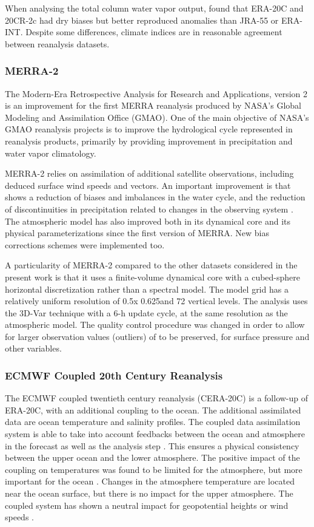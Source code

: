 \documentclass{ametsoc}
\begin{document}
When analysing the total column water vapor output, \citet{Poli2016} found that ERA-20C and 20CR-2c had dry biases but better reproduced anomalies than JRA-55 or ERA-INT. Despite some differences, climate indices are in reasonable agreement between reanalysis datasets.


\subsubsection{MERRA-2}

The Modern-Era Retrospective Analysis for Research and Applications, version 2  \citep[MERRA-2, ][]{Gelaro2017} is an improvement for the first MERRA reanalysis \citep{Rienecker2011} produced by NASA’s Global Modeling and Assimilation Office (GMAO). One of the main objective of NASA's GMAO reanalysis projects is to improve the hydrological cycle represented in reanalysis products, primarily by providing improvement in precipitation and water vapor climatology.

MERRA-2 relies on assimilation of additional satellite observations, including deduced surface wind speeds and vectors. An important improvement is that shows a reduction of biases and imbalances in the water cycle, and the reduction of discontinuities in precipitation related to changes in the observing system \citep{Gelaro2017}. The atmospheric model has also improved both in its dynamical core and its physical parameterizations since the first version of MERRA. New bias corrections schemes were implemented too.

A particularity of MERRA-2 compared to the other datasets considered in the present work is that it uses a finite-volume dynamical core with a cubed-sphere horizontal discretization rather than a spectral model. The model grid has a relatively uniform resolution of 0.5\degree x 0.625\degree and 72 vertical levels. The analysis uses the 3D-Var technique with a 6-h update cycle, at the same resolution as the atmospheric model. The quality control procedure was changed in order to allow for larger observation values (outliers) of to be preserved, for surface pressure and other variables.


\subsubsection{ECMWF Coupled 20th Century Reanalysis}

The ECMWF coupled twentieth century reanalysis (CERA-20C) is a follow-up of ERA-20C, with an additional coupling to the ocean. The additional assimilated data are ocean temperature and salinity profiles. The coupled data assimilation system is able to take into account feedbacks between the ocean and atmosphere in the forecast as well as the analysis step \citep{Laloyaux2016}. This ensures a physical consistency between the upper ocean and the lower atmosphere. The positive impact of the coupling on temperatures was found to be limited for the atmosphere, but more important for the ocean \citep{Laloyaux2016}. Changes in the atmosphere temperature are located near the ocean surface, but there is no impact for the upper atmosphere. The coupled system has shown a neutral impact for geopotential heights or wind speeds \citep{Laloyaux2016}. 
\end{document}
